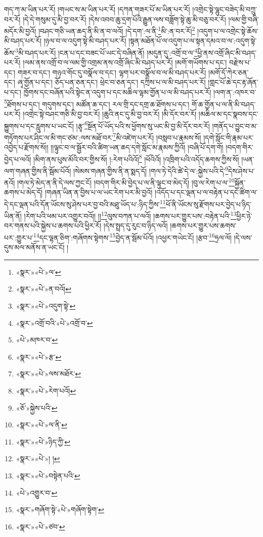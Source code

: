 གད་ཀ་མ་ཡིན་པར་རོ། །གཡང་ས་མ་ཡིན་པར་རོ། །དཀན་གཟར་པོ་མ་ཡིན་པར་རོ། །འགྲེང་སྟེ་ལྷུང་བཟེད་མི་བཀྲུ་བར་རོ། །དེ་དེ་གསུམ་དུ་མི་བྱ་བར་རོ། །དེས་འབབ་ཆུ་དྲག་པོའི་རྒྱུན་ལས་བཟློག་སྟེ་ཆུ་མི་བཅུ་བར་རོ། །ལམ་གྱི་བཞི་མདོར་མི་བྱའོ། །བཤང་གཅི་ཡན་ཆད་ནི་མི་ན་བ་ལའོ། །དེ་དག་:ལ་ནི་\footnote{«སྣར་»«པེ་»ལ་}མི་:ན་བར་རོ།\footnote{«སྣར་»«པེ་»ན་བའོ།} །འདུག་པ་ལ་འགྲེང་སྟེ་ཆོས་མི་བཤད་པར་རོ། །ཉལ་བ་ལ་འདུག་སྟེ་མི་བཤད་པར་རོ། །སྟན་མཐོན་པོ་ལ་འདུག་པ་ལ་སྟན་དམའ་བ་ལ་:འདུག་སྟེ་ཆོས་\footnote{«སྣར་»«པེ་»འདུག་སྟེ་}མི་བཤད་པར་རོ། །ངན་པ་དང་བཟང་པོ་ཡང་དེ་བཞིན་ནོ། །མདུན་དུ་:འགྲོ་བ་ལ་\footnote{«སྣར་»འགྲོ་བའི་«པེ་»འགྲོ་བ་}ཕྱི་ནས་འགྲོ་ཞིང་མི་བཤད་པར་རོ། །ལམ་ནས་འགྲོ་བ་ལ་ལམ་གྱི་འགྲམ་ནས་འགྲོ་ཞིང་མི་བཤད་པར་རོ། །མགོ་གཡོགས་པ་དང་། བརྫེས་པ་དང་། གཟར་བ་དང་། གཉའ་གོང་དུ་བསྣོལ་བ་དང་། ལྷག་པར་བསྣོལ་བ་ལ་མི་བཤད་པར་རོ། །མགོ་དོ་ཀེར་ཅན་དང་། ཞྭ་གྱོན་པ་དང་། ཅོད་པན་ཅན་དང་། ཕྲེང་བ་ཅན་དང་། དཀྲིས་པ་ལ་མི་བཤད་པར་རོ། །གླང་པོ་ཆེ་དང་རྟ་ཞོན་པ་དང་། ཁྱོགས་དང་བཞོན་པའི་སྟེང་ན་འདུག་པ་དང་མཆིལ་ལྷམ་གྱོན་པ་ལ་མི་བཤད་པར་རོ། །ལག་ན་:འཁར་བ་\footnote{«པེ་»མཁར་བ་}ཐོགས་པ་དང་། གདུགས་དང་། མཚོན་ཆ་དང་། རལ་གྲི་དང་དགྲ་ཆ་ཐོགས་པ་དང་། གོ་ཆ་གྱོན་པ་ལ་ནི་མི་བཤད་པར་རོ། །འགྲེང་སྟེ་བཤང་གཅི་མི་བྱ་བར་རོ། །ཆུའི་ནང་དུ་མི་བྱ་བར་རོ། །མི་དོར་བར་རོ། །མཆིལ་མ་དང་སྣབས་དང་སྐྱུགས་པ་དང་རླུགས་པ་ཡང་ངོ། །རྩྭ་\footnote{«སྣར་»«པེ་»རྩ་}སྔོན་པོ་ཡོད་པའི་ས་ཕྱོགས་སུ་ཡང་མི་བྱ་མི་དོར་བར་རོ། །གནོད་པ་བྱུང་བ་མ་གཏོགས་པར་ཤིང་ལ་མི་གང་ཙམ་:ལས་མཐོ་བར་\footnote{«སྣར་»«པེ་»ལས་མཐོར་}མི་འཛེག་པར་རོ། །བསླབ་པ་རྣམས་སོ། །དགེ་སློང་གི་རྣམ་པར་འབྱེད་པ་རྫོགས་སོ།། །།ལྟུང་བ་ལ་སྦྱོར་བའི་ཚིག་ཡན་ཆད་དགེ་སློང་མ་རྣམས་ཀྱིའོ། །བཞི་པོ་དག་གོ། །བདག་གིར་བྱེད་པ་ལའོ། །མིག་ནས་པུས་མོའི་བར་གྱིས་སོ། །:རེག་པའིའོ།\footnote{«སྣར་»«པེ་»རེག་པའོ།} །ཕོའིའོ། །འཁྲིག་པའི་འདོད་ཆགས་ཀྱིས་སོ། །ཡན་ལག་གཞན་གྱིས་ནི་སྦོམ་པོའོ། །སེམས་གཞན་གྱིས་ནི་ན་སྨད་དོ། །གལ་ཏེ་དེའི་ཚེ་དེ་ལ་:སྐྱེས་པའི་དེ་\footnote{«ཅོ་»སྐྱེས་པའི་}དེས་ཤེས་པ་ནའོ། །གལ་ཏེ་མེད་ན་ནི་དེ་ལས་ཀྱང་ངོ། །བདག་གིར་མི་བྱེད་པ་ལ་ནི་ལྟུང་བ་མེད་དོ། །བུ་ལ་རེག་པ་ལ་\footnote{«སྣར་»«པེ་»ལ་ནི་}སྐྱོན་ཆགས་པ་མེད་དོ། །གཞན་ཡིན་ན་བྱིས་པ་ལ་ཡང་རེག་པར་མི་བྱའོ། །འདོད་པ་དང་ལྡན་པ་ལ་བརྟེན་པ་དང་ཚིག་ལ་དེ་དང་ལྡན་པའི་དོན་ཡོངས་སུ་ཤེས་པར་བྱ་བའི་མཐུ་ཡོད་པ་:ཉིད་ཀྱིས་\footnote{«སྣར་»«པེ་»ཉིད་ཀྱི་}ཕོ་ནི་ཡོངས་སུ་རྫོགས་པར་བྱེད་པ་ཉིད་ཡིན་ནོ། །རེག་པའི་ཕམ་པར་འགྱུར་བའོ།། །།\footnote{«སྣར་»«པེ་»། །}ལུས་བཀན་པ་ལའོ། །ཆགས་པར་གྱུར་པས་:བརྟེན་པའི་\footnote{«སྣར་»«པེ་»བསྟེན་པའི་}ཕྱིར་ཉེ་བར་གནས་པའི་སྐྱེས་པ་ཆགས་པའི་ཕྱིར་རོ། །དེས་སྤྲད་དུ་རུང་བ་ཉིད་ལའོ། །ཆགས་པར་གྱུར་པས་ཆགས་པར་:གྱུར་པ་\footnote{«པེ་»འགྱུར་བ་}དང་ལྷན་ཅིག་:གཞོགས་སྟེགས་\footnote{«སྣར་»གཞོག་སྟེ་«པེ་»གཞོག་སྟེག་}བྱེད་ན་སྦོམ་པོའོ། །འཕྱར་གཡེང་ངོ། །རྩབ་\footnote{«སྣར་»«པེ་»ཙབ་}ཧྲལ་ལོ། །དེ་ལས་དུས་མལ་མནོས་ན་ཡང་ངོ། །
